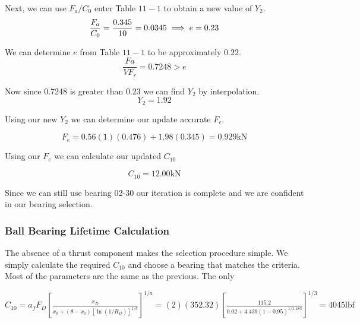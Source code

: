 \documentclass[letterpaper,12pt]{article}
\begin{document}
\noindent Next, we can use $F _ { a } / C _ { 0 }$ enter Table $11 - 1$ to obtain a new value of $Y _ { 2 }$. \\ 
\begin{equation}
\notag
\frac { F _a } { C _ { 0 } } = \frac { 0.345 } { 10 } = 0.0345 \implies e = 0.23
\end{equation}

\noindent We can determine $e$ from Table $11 - 1$ to be approximately $0.22 .$ \\
\begin{equation}
\frac { F a } { V F _ { r } } = 0.7248 > e
\end{equation}

\noindent Now since 0.7248 is greater than 0.23 we can find $Y _ { 2 }$ by interpolation. \\
\begin{equation}
    Y_2 = 1.92
\end{equation}

\noindent Using our new $Y_2$ we can determine our update accurate $F_e$.

\begin{equation}
F_e = 0.56 ( 1 )( 0.476 ) + 1.98( 0.345 ) = 0.929 \mathrm{kN}
\end{equation}

\noindent Using our $F_e$ we can calculate our updated $C_{10}$

\begin{equation}
    C _ { 10 } = 12.00 \mathrm { kN }
\end{equation}

\noindent Since we can still use bearing 02-30 our iteration is complete and we are confident in our bearing selection.

\subsubsection{Ball Bearing Lifetime Calculation}

The absence of a thrust component makes the selection procedure simple. We simply calculate the required $C_{10}$ and choose a bearing that matches the criteria. Most of the parameters are the same as the previous. The only


$C _ { 10 } = a _ { f } F _ { D } \left[ \frac { x _ { D } } { x _ { 0 } + \left( \theta - x _ { 0 } \right) \left[ \ln \left( 1 / R _ { D } \right) \right] ^ { 1 / b } } \right] ^ { 1 / a } = ( 2 ) ( 352.32 ) \left[ \frac { 115.2 } { 0.02 + 4.439 ( 1 - 0.95 ) ^ { 1 / 1.483 } } \right] ^ { 1 / 3 } = 4045 \mathrm { lbf }$
\end{document}
